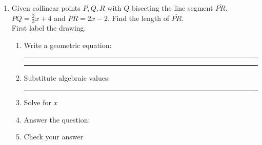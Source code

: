 \documentclass[12pt, oneside]{article}
\begin{document}
\begin{enumerate}
\newpage
      \item Given collinear points $P, Q, R$ with $Q$ bisecting the line segment $\overline{PR}$. $PQ=\frac{2}{3} x+4$ and $PR = 2x-2$. Find the length of $\overline{PR}$.\\ \bigskip
      First label the drawing.
      \begin{flushright}
      \end{flushright}
      \vspace{1cm}
      \begin{enumerate}
        \item Write a geometric equation: \rule{4cm}{0.15mm} \hspace{1cm} \rule{4cm}{0.15mm}
        \vspace{.7cm}
        \item Substitute algebraic values: \rule{4cm}{0.15mm}
        \item Solve for $x$
        \vspace{4.5cm}
        \item Answer the question:
        \vspace{2.5cm}
        \item Check your answer
      \end{enumerate}

\end{enumerate}
\end{document}
